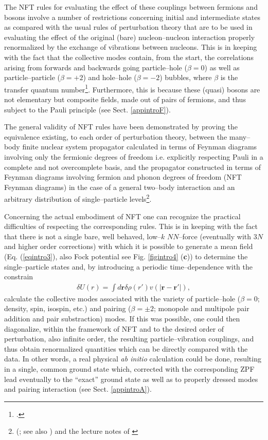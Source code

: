 The NFT rules  for evaluating the effect of these couplings between fermions and bosons involve a number of restrictions concerning initial and intermediate states as compared with the usual rules of perturbation theory that are to be used in evaluating the effect of the original (bare) nucleon--nucleon interaction properly renormalized by  the exchange of vibrations between nucleons. This is in keeping with the fact that the collective modes contain, from the start,  the correlations arising from forwards and backwards going  particle--hole ($\beta=0$) as well as particle--particle ($\beta=+2$) and hole--hole ($\beta=-2$) bubbles, where $\beta$ is the transfer quantum number\footnote{\cite{Bohr:64}.}. Furthermore, this is because these (quasi) bosons are not elementary but composite fields, made out of pairs of fermions, and thus subject to the Pauli principle (see Sect. \ref{appintroF}). 
 

The general validity of NFT rules have been demonstrated by proving the equivalence existing, to each order of perturbation theory, between the many--body finite nuclear system propagator calculated in terms of Feynman diagrams involving only the fermionic degrees of freedom i.e. explicitly respecting Pauli in a complete and not overcomplete basis, and the propagator constructed in terms of Feynman diagrams involving fermion and phonon degrees of freedom (NFT Feynman diagrams) in the case of a general two--body interaction and an arbitrary distribution of single--particle levels\footnote{(\cite{Bes:75}; see also \cite{Baranger:69}) and the  lecture notes of  \cite{McFarlane:69}}.



 Concerning the actual embodiment of NFT one can recognize the practical difficulties of respecting the corresponding rules. This is in keeping with the fact that there is not a single bare, well behaved, low--$k$ $NN$--force (eventually with 3$N$ and higher order corrections) with which it is possible to generate a mean field (Eq. (\ref{eqintro3}), also Fock potential see Fig. \ref{figintro4} (\textbf{c})) to determine the single--particle states and, by introducing a periodic time--dependence with the constrain
\begin{align}\label{eq1.5.1}
\delta U(r)=\int d\mathbf{r} \delta \rho(r') v(|\mathbf r- \mathbf r'|),
\end{align}
calculate the collective modes associated with the variety of particle--hole ($\beta=0$; density, spin, isospin, etc.) and pairing ($\beta=\pm2$; monopole and multipole pair addition and pair substraction) modes. If this was possible, one could then diagonalize, within the framework of NFT and to the desired order of perturbation, also infinite order, the resulting particle--vibration couplings, and thus obtain renormalized quantities which can be directly compared with the data.
 In other words, a real physical \textit{ab initio} calculation could be done, resulting in a single,  common ground state which, corrected with the corresponding  ZPF lead eventually to the ``exact'' ground state as well as to properly dressed modes and pairing interaction  (see Sect. \ref{appintroA}).



